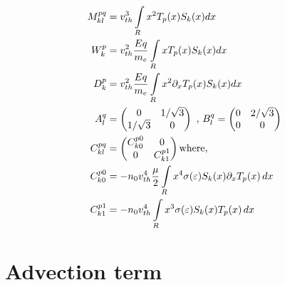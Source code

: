 \documentclass{article}[draft]
\begin{document}
\begin{align*}
M^{pq}_{kl} &= v_{th}^3 \myint_{R} x^2 T_p \of{x} S_k\of{x} dx \\
W^{p}_{k}   &= v_{th}^2 \frac{E q}{m_e} \myint_{R} x T_p \of{x} S_k\of{x} dx \\
D^{p}_{k}   &= v_{th}^2 \frac{E q}{m_e} \myint_{R} x^2 \partial_x T_p \of{x} S_k\of{x} dx \\
A^{q}_{l} &=\begin{pmatrix}
0  & 1/\sqrt{3} \\
1/\sqrt{3}  & 0 \\
\end{pmatrix} \text{ , } 
B^{q}_{l} = \begin{pmatrix}
0 & 2/\sqrt{3}\\
0 & 0 
\end{pmatrix}\\
C^{pq}_{kl} &= \begin{pmatrix}
C^{p0}_{k0} & 0 \\
0  & C^{p1}_{k1} \\
\end{pmatrix}\text{where, } \\
C^{p0}_{k0}  &= -n_0 v_{th}^4 \frac{\mu}{2} \myint_{R} x^4 \sigma\of{\varepsilon} S_k\of{x}\partial_{x} T_p\of{x} \diff{x}  \\
C^{p1}_{k1}  &= -n_0 v_{th}^4 \myint_{R} x^3 \sigma\of{\varepsilon} S_k\of{x} T_p\of{x} \diff{x} 
\end{align*}






\clearpage
\section{Advection term}
\end{document}
